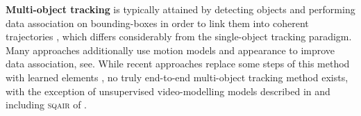 %	
%
	\textbf{Multi-object tracking} is typically attained by detecting objects and performing data association on bounding-boxes in order to link them into coherent trajectories \citep{Zhang2008,Milan2014,Bae2017confidence,Keuper2018motion}, which differs considerably from the single-object tracking paradigm.
	Many approaches additionally use motion models and appearance to improve data association, see\eg \cite{Bewley2016sort}.
	While recent approaches replace some steps of this method with learned elements \citep{Schulter2017deepnf,Nam2016,Ning2017,Keuper2018motion,Bae2017confidence,Xiang2015}, no truly end-to-end multi-object tracking method exists, with the exception of unsupervised video-modelling models described in  and including \textsc{sqair} of .
	
	
	
